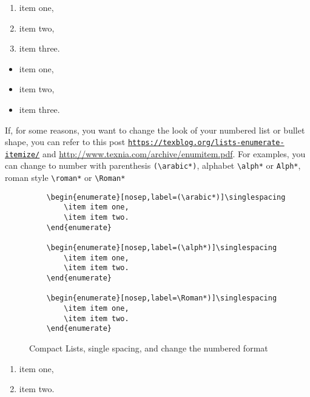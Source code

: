 \begin{enumerate}[nosep]\singlespacing
	\item item one,
	\item item two,
	\item item three.
\end{enumerate}

\begin{itemize}[nosep]\singlespacing
	\item item one,
	\item item two,
	\item item three.
\end{itemize}

If, for some reasons, you want to change the look of your numbered list or bullet shape, you can refer to this post \href{https://texblog.org/2008/10/16/lists-enumerate-itemize-description-and-how-to-change-them/}{\texttt{https://texblog.org/lists-enumerate-itemize/}} and \url{http://www.texnia.com/archive/enumitem.pdf}. For examples, you can change to number with parenthesis \verb|(\arabic*)|, alphabet \verb|\alph*| or \verb|Alph*|, roman style \verb|\roman*| or \verb|\Roman*|             

\begin{figure}[htb!]
	\begin{lstlisting}
	\begin{enumerate}[nosep,label=(\arabic*)]\singlespacing
		\item item one,
		\item item two.
	\end{enumerate}
	
	\begin{enumerate}[nosep,label=(\alph*)]\singlespacing
		\item item one,
		\item item two.
	\end{enumerate}
	
	\begin{enumerate}[nosep,label=\Roman*)]\singlespacing
		\item item one,
		\item item two.
	\end{enumerate}
	\end{lstlisting}
	\caption{Compact Lists, single spacing, and change the numbered format}\label{fig:enumitemchangeformatsinglespacing}
\end{figure}

\begin{enumerate}[nosep,label=(\arabic*)]\singlespacing
	\item item one,
	\item item two.
\end{enumerate}

